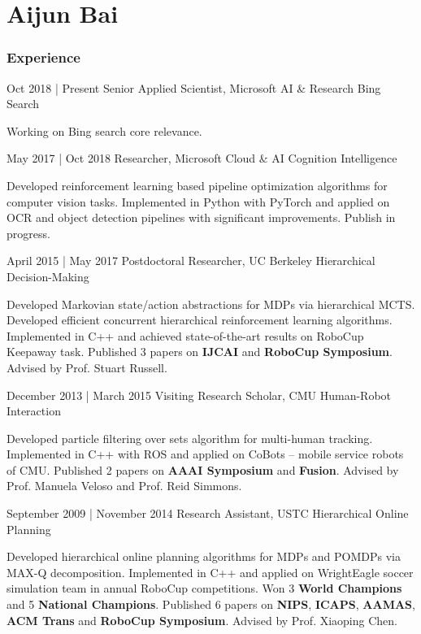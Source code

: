 \documentclass[fontsize=10pt]{tccv}
\begin{document}
\part{Aijun Bai}

\section{Experience}

\begin{eventlist}

	\item{Oct 2018 | Present}
	      {Senior Applied Scientist, Microsoft AI \& Research}
	      {Bing Search}

    Working on Bing search core relevance.

	\item{May 2017 | Oct 2018}
	      {Researcher, Microsoft Cloud \& AI}
	      {Cognition Intelligence}

	Developed reinforcement learning based pipeline optimization algorithms for computer vision tasks. Implemented in Python with PyTorch and applied on OCR and object detection pipelines with significant improvements. Publish in progress.

	\item{April 2015 | May 2017}
	      {Postdoctoral Researcher, UC Berkeley}
	      {Hierarchical Decision-Making}

	Developed Markovian state/action abstractions for MDPs via hierarchical MCTS.  Developed efficient concurrent hierarchical reinforcement learning algorithms. Implemented in C++ and achieved state-of-the-art results on RoboCup Keepaway task. Published 3 papers on \textbf{IJCAI} and \textbf{RoboCup Symposium}. Advised by Prof. Stuart Russell.

	\item{December 2013 | March 2015}
	      {Visiting Research Scholar, CMU}
	      {Human-Robot Interaction}

	Developed particle filtering over sets algorithm for multi-human tracking. Implemented in C++ with ROS and applied on CoBots -- mobile service robots of CMU. Published 2 papers on \textbf{AAAI Symposium} and \textbf{Fusion}. Advised by Prof. Manuela Veloso and Prof. Reid Simmons.

	\item{September 2009 | November 2014}
	      {Research Assistant, USTC}
	      {Hierarchical Online Planning}

	Developed hierarchical online planning algorithms for MDPs and POMDPs via MAX-Q decomposition. Implemented in C++ and applied on WrightEagle soccer simulation team in annual RoboCup competitions. Won 3 \textbf{World Champions} and 5 \textbf{National Champions}.  Published 6 papers on \textbf{NIPS}, \textbf{ICAPS}, \textbf{AAMAS}, \textbf{ACM Trans} and \textbf{RoboCup  Symposium}. Advised by Prof. Xiaoping Chen.

\end{eventlist}
\end{document}
